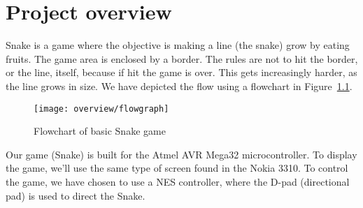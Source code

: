 \chapter{Project overview}

Snake is a game where the objective is making a line (the snake) grow by eating fruits. The game area is enclosed by a border. The rules are not to hit the border, or the line, itself, because if hit the game is over. This gets increasingly harder, as the line grows in size. We have depicted the flow using a flowchart in Figure~\ref{fig:flow}.

\begin{figure}
\centering
\texttt{[image: overview/flowgraph]}
\caption{Flowchart of basic Snake game}
\label{fig:flow}
\end{figure}

Our game (Snake) is built for the Atmel AVR Mega32 microcontroller. To display the game, we'll use the same type of screen found in the Nokia 3310. To control the game, we have chosen to use a NES controller, where the D-pad (directional pad) is used to direct the Snake.

